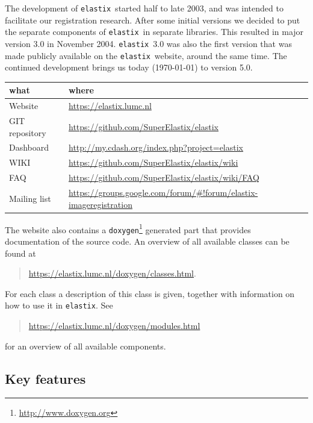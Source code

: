 \documentclass[]{report}
\newcommand{\elastix}{\texttt{elastix}}
\begin{document}
The development of \elastix\ started half to late 2003, and was
intended to facilitate our registration research. After some initial
versions we decided to put the separate components of \elastix\ in
separate libraries. This resulted in major version 3.0 in November
2004. \elastix\ 3.0 was also the first version that was made
publicly available on the \elastix\ website, around the same time.
The continued development brings us today (\today) to version 5.0.

\begin{table}[h!]
\begin{tabular}{l|l}
what & where \\
\hline
Website        & \url{https://elastix.lumc.nl} \\
GIT repository & \url{https://github.com/SuperElastix/elastix} \\
Dashboard      & \url{http://my.cdash.org/index.php?project=elastix} \\
WIKI           & \url{https://github.com/SuperElastix/elastix/wiki} \\
FAQ            & \url{https://github.com/SuperElastix/elastix/wiki/FAQ} \\
Mailing list   &
\url{https://groups.google.com/forum/#!forum/elastix-imageregistration}
\end{tabular}
\end{table}

The website also contains a
\texttt{doxygen}\footnote{\url{http://www.doxygen.org}} generated part that
provides documentation of the source code. An overview of all available classes
can be found at
\begin{quote}
\url{https://elastix.lumc.nl/doxygen/classes.html}.
\end{quote}
For each class a description of this class is given, together with
information on how to use it in \elastix. See
\begin{quote}
\url{https://elastix.lumc.nl/doxygen/modules.html}
\end{quote}
for an overview of all available components.

\subsection{Key features}\label{sec:elastix:key}
\end{document}
